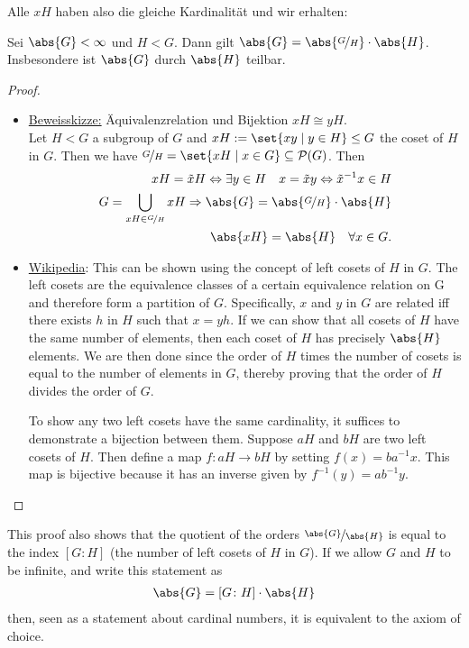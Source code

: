 Alle $xH$ haben also die gleiche Kardinalität und wir erhalten:
\begin{proposition}
	\label{1_2_9_lagrange}
	Sei $\abs{G} < \infty$ und $H < G$. Dann gilt $\abs{G} = \abs{\lnkset{G}{H}}\cdot \abs{H}$. Insbesondere ist $\abs{G}$ durch $\abs{H}$ teilbar.
\end{proposition}
\begin{proof}
	\begin{itemize}
		\item \ul{Beweisskizze:} Äquivalenzrelation und Bijektion $xH \cong yH$.\\
		Let $H < G$ a subgroup of $G$ and $xH := \set{xy \mid y \in H} \le G$ the coset of $H$ in $G$. Then we have $\lnkset{G}{H} = \set{xH \mid x \in G} \subseteq \powerset(G)$. Then
		\begin{align*}
		xH = \tilde{x}H \Leftrightarrow \exists y \in H \quad x = \tilde{x}y \Leftrightarrow \tilde{x}^{-1}x \in H\\
		G = \bigcup_{xH \in \lnkset{G}{H}} xH \implies \abs{G} = \abs{\lnkset{G}{H}}\cdot \abs{H}\\
		\abs{xH} = \abs{H} \quad \forall x \in G.
		\end{align*}
		\item \ul{Wikipedia}:
		This can be shown using the concept of left cosets of $H$ in $G$. The left cosets are the equivalence classes of a certain equivalence relation on G and therefore form a partition of $G$. Specifically, $x$ and $y$ in $G$ are related iff there exists $h$ in $H$ such that $x = yh$. If we can show that all cosets of $H$ have the same number of elements, then each coset of $H$ has precisely $\abs{H}$ elements. We are then done since the order of $H$ times the number of cosets is equal to the number of elements in $G$, thereby proving that the order of $H$ divides the order of $G$.
		
		To show any two left cosets have the same cardinality, it suffices to demonstrate a bijection between them. Suppose $aH$ and $bH$ are two left cosets of $H$. Then define a map $f \colon aH \to bH$ by setting $f(x) = ba^{-1}x$. This map is bijective because it has an inverse given by $f^{-1}(y) = ab^{-1}y$. 
	\end{itemize}
\end{proof}

\begin{*remark}
	This proof also shows that the quotient of the orders $\lnkset{\abs{G}}{\abs{H}}$ is equal to the index $[G \colon H]$ (the number of left cosets of $H$ in $G$). If we allow $G$ and $H$ to be infinite, and write this statement as
	\begin{align*}
	\abs{G} = [G\colon H] \cdot \abs{H}
	\end{align*}
	then, seen as a statement about cardinal numbers, it is equivalent to the axiom of choice.
\end{*remark}

